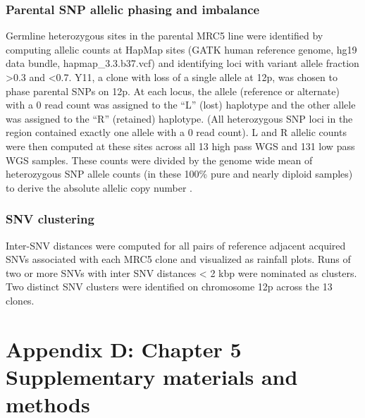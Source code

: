 \documentclass[phd,tocprelim]{cornell}
\begin{document}
\subsection*{Parental SNP allelic phasing and imbalance}
Germline heterozygous sites in the parental MRC5 line were identified by computing allelic counts at HapMap sites (GATK human reference genome, hg19 data bundle, hapmap\_3.3.b37.vcf) and identifying loci with variant allele fraction >0.3 and <0.7.  Y11, a clone with loss of a single allele at 12p, was chosen to phase parental SNPs on 12p. At each locus, the allele (reference or alternate) with a 0 read count was assigned to the “L” (lost) haplotype and the other allele was assigned to the “R” (retained) haplotype. (All heterozygous SNP loci in the region contained exactly one allele with a 0 read count). L and R allelic counts were then computed at these sites across all 13 high pass WGS and 131 low pass WGS samples. These counts were divided by the genome wide mean of heterozygous SNP allele counts (in these 100\% pure and nearly diploid samples) to derive the absolute allelic copy number \cite{Carter2012-xo}.

\subsection*{SNV clustering}
Inter-SNV distances were computed for all pairs of reference adjacent acquired SNVs associated with each MRC5 clone and visualized as rainfall plots. Runs of two or more SNVs with inter SNV distances < 2 kbp were nominated as clusters. Two distinct SNV clusters were identified on chromosome 12p across the 13 clones.  

\chapter*{Appendix D: Chapter 5 Supplementary materials and methods} \label{app:d}
\end{document}
